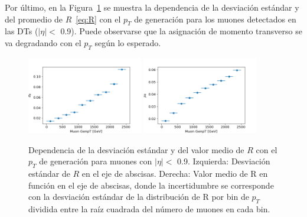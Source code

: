 \clearpage

Por \'ultimo, en la Figura~\ref{fig:data_R_genpt} se muestra la dependencia de la desviaci\'on est\'andar y del promedio de $R$~\eqref{eq:R} con el $p_{T}$ de generaci\'on para los muones detectados en las DTs ($\lvert \eta \rvert <$ 0.9). Puede observarse que la asignaci\'on de momento transverso se va degradando con el $p_{T}$ seg\'un lo esperado. \\

\begin{figure}[h!]
\centering
\includegraphics[width=0.45\textwidth]{figures/data_genpt_DT_sigmaR.png}
\includegraphics[width=0.45\textwidth]{figures/data_genpt_DT_R.png}
\caption{Dependencia de la desviaci\'on est\'andar y del valor medio de $R$ con el $p_{T}$ de generaci\'on para muones con $\lvert \eta \rvert <$ 0.9. Izquierda: Desviaci\'on est\'andar de $R$ en el eje de abscisas. Derecha: Valor medio de R en funci\'on en el eje de abscisas, donde la incertidumbre se corresponde con la desviación est\'andar de la distribuci\'on de R por bin de $p_{T}$ dividida entre la ra\'iz cuadrada del n\'umero de muones en cada bin.}
\label{fig:data_R_genpt}        
\end{figure}


\clearpage


 
